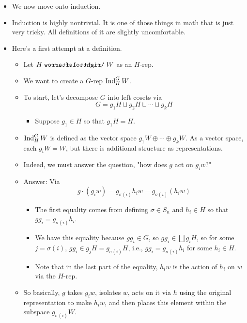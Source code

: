 \documentclass[../notes.tex]{subfiles}
\begin{document}
\begin{itemize}
\begin{itemize}
    \end{itemize}
    \item We now move onto induction.
    \item Induction is highly nontrivial. It is one of those things in math that is just very tricky. All definitions of it are slightly uncomfortable.
    \item Here's a first attempt at a definition.
    \begin{itemize}
        \item Let $H\acts W$ as an $H$-rep.
        \item We want to create a $G$-rep $\operatorname{Ind}_H^GW$.
        \item To start, let's decompose $G$ into left cosets via
        \begin{equation*}
            G = g_1H\sqcup g_2H\sqcup\cdots\sqcup g_kH
        \end{equation*}
        \begin{itemize}
            \item Suppose $g_1\in H$ so that $g_1H=H$.
        \end{itemize}
        \item $\operatorname{Ind}_H^GW$ is defined as the vector space $g_1W\oplus\cdots\oplus g_kW$. As a vector space, each $g_iW=W$, but there is additional structure as representations.
        \item Indeed, we must answer the question, "how does $g$ act on $g_iw$?"
        \item Answer: Via
        \begin{equation*}
            g\cdot(g_iw) = g_{\sigma(i)}h_iw
            = g_{\sigma(i)}(h_iw)
        \end{equation*}
        \begin{itemize}
            \item The first equality comes from defining $\sigma\in S_n$ and $h_i\in H$ so that $gg_i=g_{\sigma(i)}h_i$.
            \item We have this equality because $gg_i\in G$, so $gg_i\in\bigsqcup g_iH$, so for some $j=\sigma(i)$, $gg_i\in g_jH=g_{\sigma(i)}H$, i.e., $gg_i=g_{\sigma(i)}h_i$ for some $h_i\in H$.
            \item Note that in the last part of the equality, $h_iw$ is the action of $h_i$ on $w$ via the $H$-rep.
        \end{itemize}
        \item So basically, $g$ takes $g_iw$, isolates $w$, acts on it via $h$ using the original representation to make $h_iw$, and then places this element within the subspace $g_{\sigma(i)}W$.

\end{itemize}
\end{itemize}
\end{document}
